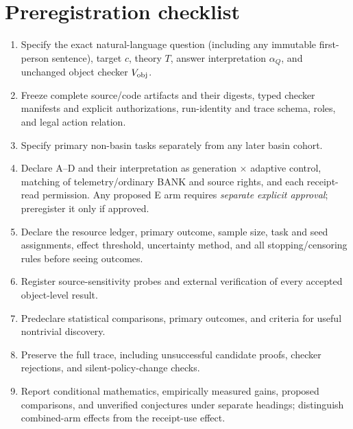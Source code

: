 \documentclass[11pt,letterpaper]{article}
\begin{document}
\section{Preregistration checklist}
\begin{enumerate}
\item Specify the exact natural-language question (including any immutable first-person sentence), target $c$, theory $T$, answer interpretation $\alpha_Q$, and unchanged object checker $V_{\rm obj}$.
\item Freeze complete source/code artifacts and their digests, typed checker manifests and explicit authorizations, run-identity and trace schema, roles, and legal action relation.
\item Specify primary non-basin tasks separately from any later basin cohort.
\item Declare A--D and their interpretation as generation $\times$ adaptive control, matching of telemetry/ordinary BANK and source rights, and each receipt-read permission. Any proposed E arm requires \emph{separate explicit approval}; preregister it only if approved.
\item Declare the resource ledger, primary outcome, sample size, task and seed assignments, effect threshold, uncertainty method, and all stopping/censoring rules before seeing outcomes.
\item Register source-sensitivity probes and external verification of every accepted object-level result.
\item Predeclare statistical comparisons, primary outcomes, and criteria for useful nontrivial discovery.
\item Preserve the full trace, including unsuccessful candidate proofs, checker rejections, and silent-policy-change checks.
\item Report conditional mathematics, empirically measured gains, proposed comparisons, and unverified conjectures under separate headings; distinguish combined-arm effects from the receipt-use effect.
\end{enumerate}
\end{document}
